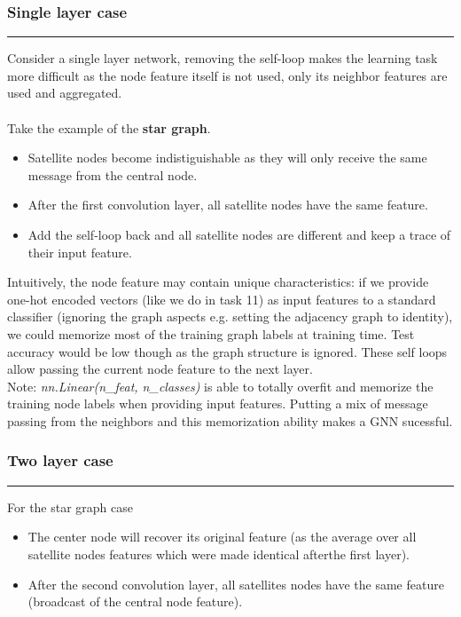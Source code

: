 \documentclass[a4paper]{article}
\begin{document}
\subsubsection*{Single layer case}
\hrule

Consider a single layer network, removing the self-loop makes the learning task more difficult as the node feature itself is not used, only its neighbor features are used and aggregated.
\\
\\
Take the example of the \textbf{star graph}. 
\begin{itemize}
    \item Satellite nodes become indistiguishable as they will only receive the same message from the central node. 
    \item After the first convolution layer, all satellite nodes have the same feature.
    \item Add the self-loop back and all satellite nodes are different and keep a trace of their input feature.
\end{itemize}

Intuitively, the node feature may contain unique characteristics: 
if we provide one-hot encoded vectors (like we do in task 11) as input features to a standard classifier (ignoring the graph aspects e.g. setting the adjacency graph to identity),
we could memorize most of the training graph labels at training time. Test accuracy would be low though as the graph structure is ignored.
These self loops allow passing the current node feature to the next layer.\\
Note: \textit{nn.Linear(n\_feat, n\_classes)} is able to totally overfit and memorize the training node labels when providing input features.
Putting a mix of message passing from the neighbors and this memorization ability makes a GNN sucessful.




\subsubsection*{Two layer case}
\hrule

For the star graph case
\begin{itemize}
    \item The center node will recover its original feature (as the average over all satellite nodes features which were made identical afterthe first layer).
    \item After the second convolution layer, all satellites nodes have the same feature (broadcast of the central node feature).
\end{itemize}
\end{document}
